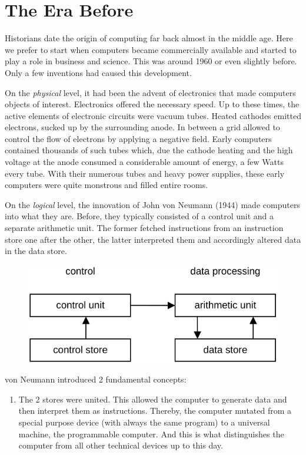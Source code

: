 \setcounter{section}{-1}
\section{The Era Before}
Historians date the origin of computing far back almost in the middle age. Here we
prefer to start when computers became commercially available and started to play
a role in business and science. This was around 1960 or even slightly before. Only
a few inventions had caused this development.

\begin{description}
  \item On the \emph{physical} level, it had been the advent of electronics that
  made computers objects of interest. Electronics offered the necessary speed. Up
  to these times, the active elements of electronic circuits were vacuum tubes.
  Heated cathodes emitted electrons, sucked up by the surrounding anode. In
  between a grid allowed to control the flow of electrons by applying a negative
  field. Early computers contained thousands of such tubes which, due the cathode
  heating and the high voltage at the anode consumed a considerable amount of
  energy, a few Watts every tube. With their numerous tubes and heavy power
  supplies, these early computers were quite monstrous and filled entire rooms.

  \item On the \emph{logical} level, the innovation of John von Neumann (1944) made
  computers into what they are. Before, they typically consisted of a control unit
  and a separate arithmetic unit. The former fetched instructions from an instruction
  store one after the other, the latter interpreted them and accordingly altered data
  in the data store.
  \begin{figure}[h!]
    \flushright
    \includegraphics[width=.8\textwidth]{i/0}
  \end{figure}

  von Neumann introduced 2 fundamental concepts:
  \begin{enumerate}
    \item The 2 stores were united. This allowed the computer to generate data and
    then interpret them as instructions. Thereby, the computer mutated from a special
    purpose device (with always the same program) to a universal machine, the
    programmable computer. And this is what distinguishes the computer from all other
    technical devices up to this day.


\end{enumerate}
\end{description}
